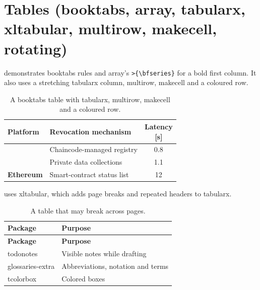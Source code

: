\section{Tables (booktabs, array, tabularx, xltabular, multirow, makecell, rotating)}\label{guide:latex:tables}
 demonstrates booktabs rules and array's \texttt{>\{\textbackslash bfseries\}} for a bold first column. It also uses a stretching tabularx column, multirow, makecell and a coloured row.
\begin{table}[!ht]
  \centering
  \caption{A booktabs table with tabularx, multirow, makecell and a coloured row.}\label{guide:tab:latex:booktabs}
  \begin{tabularx}{\linewidth}{>{\bfseries}l X c}
    \toprule
    Platform & Revocation mechanism & \makecell{Latency\\{[s]}} \\
    \midrule
    \multirow{2}{*}{Fabric} & Chaincode-managed registry & 0.8 \\
     & Private data collections & 1.1 \\
    \rowcolor{gray!15}
    Ethereum & Smart-contract status list & 12 \\
    \bottomrule
  \end{tabularx}
\end{table}

 uses xltabular, which adds page breaks and repeated headers to tabularx.
\begin{xltabular}{\linewidth}{l X}
  \caption{A table that may break across pages.}\label{guide:tab:latex:long}\\
  \toprule
  \textbf{Package} & \textbf{Purpose} \\
  \midrule
  \endfirsthead
  \toprule
  \textbf{Package} & \textbf{Purpose} \\
  \midrule
  \endhead
  todonotes & Visible notes while drafting \\
  glossaries-extra & Abbreviations, notation and terms \\
  tcolorbox & Colored boxes \\
  \bottomrule
\end{xltabular}

